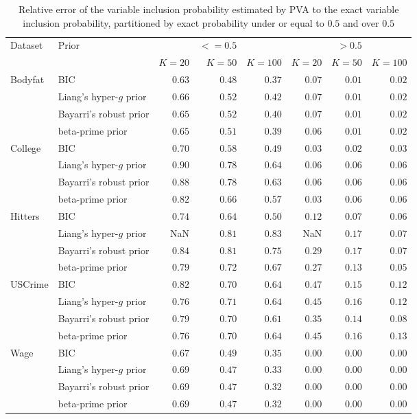 \begin{table}[!ht]
{\scriptsize 
\begin{tabular}{|ll|rrr|rrr|}
	\hline
	Dataset & Prior & & $<=0.5$ & & & $>0.5$ &\\
	& & $K = 20$ & $K = 50$ & $K = 100$ & $K = 20$ & $K = 50$ & $K = 100$ \\
	\hline
	Bodyfat    &BIC                     &$0.63$&$0.48$&$0.37$&$0.07$&$0.01$&$0.02$\\
			   &Liang's hyper-$g$ prior &$0.66$&$0.52$&$0.42$&$0.07$&$0.01$&$0.02$\\
			   &Bayarri's robust prior  &$0.65$&$0.52$&$0.40$&$0.07$&$0.01$&$0.02$\\
			   &beta-prime prior                       &$0.65$&$0.51$&$0.39$&$0.06$&$0.01$&$0.02$\\
	College    &BIC                     &$0.70$&$0.58$&$0.49$&$0.03$&$0.02$&$0.03$\\
	&Liang's hyper-$g$ prior            &$0.90$&$0.78$&$0.64$&$0.06$&$0.06$&$0.06$\\
	&Bayarri's robust prior             &$0.88$&$0.78$&$0.63$&$0.06$&$0.06$&$0.06$\\
	&beta-prime prior                                 &$0.82$&$0.66$&$0.57$&$0.03$&$0.06$&$0.06$\\
	Hitters   &BIC                      &$0.74$&$0.64$&$0.50$&$0.12$&$0.07$&$0.06$\\
	&Liang's hyper-$g$ prior            & NaN  &$0.81$&$0.83$&NaN   &$0.17$&$0.07$\\
	&Bayarri's robust prior             &$0.84$&$0.81$&$0.75$&$0.29$&$0.17$&$0.07$\\
	&beta-prime prior                                  &$0.79$&$0.72$&$0.67$&$0.27$&$0.13$&$0.05$\\
	USCrime&BIC                         &$0.82$&$0.70$&$0.64$&$0.47$&$0.15$&$0.12$\\
	&Liang's hyper-$g$ prior            &$0.76$&$0.71$&$0.64$&$0.45$&$0.16$&$0.12$\\
	&Bayarri's robust prior             &$0.79$&$0.70$&$0.61$&$0.35$&$0.14$&$0.08$\\
	&beta-prime prior                                  &$0.76$&$0.70$&$0.64$&$0.45$&$0.16$&$0.13$\\
	Wage&BIC                            &$0.67$&$0.49$&$0.35$&$0.00$&$0.00$&$0.00$\\
	&Liang's hyper-$g$ prior            &$0.69$&$0.47$&$0.33$&$0.00$&$0.00$&$0.00$\\
	&Bayarri's robust prior             &$0.69$&$0.47$&$0.32$&$0.00$&$0.00$&$0.00$\\
	&beta-prime prior                                  &$0.69$&$0.47$&$0.32$&$0.00$&$0.00$&$0.00$\\
	\hline
\end{tabular}
}
\label{tab:variable_inclusion_rel_error}
\bigskip  
\caption{Relative error of the variable inclusion probability estimated by PVA to the
					exact variable inclusion probability, partitioned by exact probability under or equal to $0.5$ and
					over $0.5$}
\end{table}

